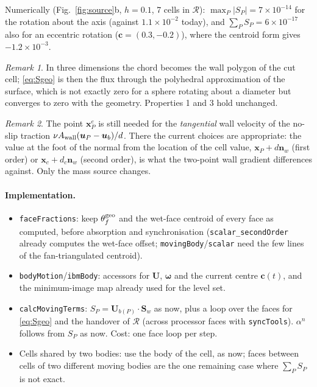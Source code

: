 \documentclass[11pt,a4paper]{article}
\theoremstyle{remark}
\newtheorem{remark}{Remark}
\newcommand{\uu}{\bm{u}}
\newcommand{\ub}{\uu_b}
\newcommand{\nn}{\bm{n}}
\newcommand{\xx}{\bm{x}}
\newcommand{\Sw}{\bm{S}_w}
\newcommand{\Aw}{A_{\rm wall}}
\newcommand{\code}[1]{\texttt{#1}}
\newcommand{\w}{\bm\omega}
\begin{document}
\noindent Numerically (Fig.~\ref{fig:source}b, $h=0.1$, 7 cells in $\mathcal R$): $\max_P|S_P|=7\times
10^{-14}$ for the rotation about the axis (against $1.1\times10^{-2}$ today), and $\sum_PS_P=
6\times10^{-17}$ also for an eccentric rotation ($\bm c=(0.3,-0.2)$), where the centroid form
gives $-1.2\times10^{-3}$.

\begin{remark}
In three dimensions the chord becomes the wall polygon of the cut cell; \eqref{eq:Sgeo} is then the
flux through the polyhedral approximation of the surface, which is not exactly zero for a
sphere rotating about a diameter but converges to zero with the geometry. Properties 1 and 3 hold
unchanged.
\end{remark}

\begin{remark}
The point $\xx^e_P$ is still needed for the \emph{tangential} wall velocity of the no-slip
traction $\nu\Aw(\uu_P-\ub)/d$. There the current choices are appropriate: the value at the
foot of the normal from the location of the cell value, $\xx_P+d\nn_w$ (first order) or
$\xx_c+d_c\nn_w$ (second order), is what the two-point wall gradient differences against. Only
the mass source changes.
\end{remark}

\paragraph{Implementation.}
\begin{itemize}\itemsep1pt
\item \code{faceFractions}: keep $\theta^{\rm geo}_f$ and the wet-face centroid of every face as
      computed, before absorption and synchronisation (\code{scalar\_secondOrder} already
      computes the wet-face offset; \code{movingBody}/\code{scalar} need the few lines of the
      fan-triangulated centroid).
\item \code{bodyMotion}/\code{ibmBody}: accessors for $\bm U$, $\w$ and the current centre
      $\bm c(t)$, and the minimum-image map already used for the level set.
\item \code{calcMovingTerms}: $S_P=\bm U_{b(P)}\cdot\Sw$ as now, plus a loop over the faces for
      \eqref{eq:Sgeo} and the handover of $\mathcal R$ (across processor faces with
      \code{syncTools}). $\alpha^n$ follows from $S_P$ as now. Cost: one face loop per step.
\item Cells shared by two bodies: use the body of the cell, as now; faces between cells of two
      different moving bodies are the one remaining case where $\sum_PS_P$ is not exact.
\end{itemize}
\end{document}
